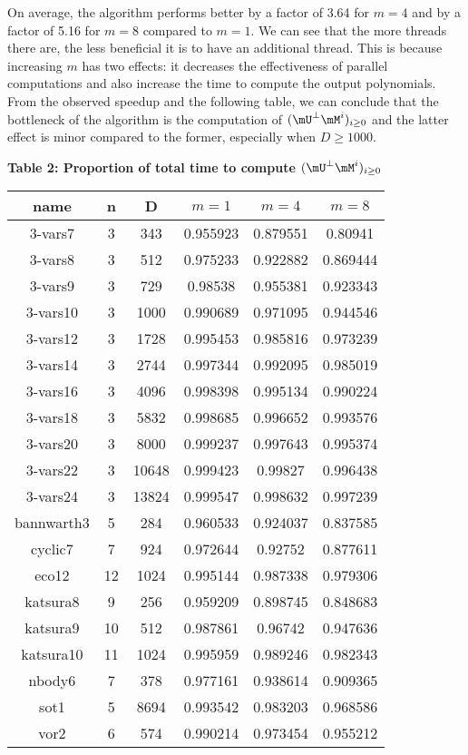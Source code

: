 \documentclass[12pt]{article}
\begin{document}
On average, the algorithm performs better by a factor of 3.64 for
$m=4$ and by a factor of 5.16 for $m=8$ compared to $m=1$. We can
see that the more threads there are, the less beneficial it is
to have an additional thread. This is because
increasing $m$ has two effects: it
decreases the effectiveness of parallel computations and
also increase the time to compute the output polynomials.
From the observed speedup and the following table, 
we can conclude that the bottleneck of the
algorithm is the computation of $(\mU^{\perp} \mM^i)_{i\ge0}$ and
the latter effect is minor compared to the former, especially when
$D \ge 1000$.
\begin{center}
	\textbf{Table 2: Proportion of total time to compute $(\mU^{\perp} \mM^i)_{i\ge0}$}
	\begin{tabular}{c|c|c|c|c|c}
		\textbf{name} & n & D & $m=1$ & $m=4$ & $m=8$\\
		\hline
		3-vars7&3 &343&0.955923&0.879551&0.80941\\
		3-vars8&3 &512&0.975233&0.922882&0.869444\\
		3-vars9&3 &729&0.98538&0.955381&0.923343\\
		3-vars10&3 &1000&0.990689&0.971095&0.944546\\
		3-vars12&3 &1728&0.995453&0.985816&0.973239\\
		3-vars14&3 &2744&0.997344&0.992095&0.985019\\
		3-vars16&3 &4096&0.998398&0.995134&0.990224\\
		3-vars18&3 &5832&0.998685&0.996652&0.993576\\
		3-vars20&3 &8000&0.999237&0.997643&0.995374\\
		3-vars22&3 &10648&0.999423&0.99827&0.996438\\
		3-vars24&3 &13824&0.999547&0.998632&0.997239\\
		bannwarth3&5 &284&0.960533&0.924037&0.837585\\
		cyclic7&7 &924&0.972644&0.92752&0.877611\\
		eco12&12 &1024&0.995144&0.987338&0.979306\\
		katsura8&9 &256&0.959209&0.898745&0.848683\\
		katsura9&10 &512&0.987861&0.96742&0.947636\\
		katsura10&11 &1024&0.995959&0.989246&0.982343\\
		nbody6&7 &378&0.977161&0.938614&0.909365\\
		sot1&5 &8694&0.993542&0.983203&0.968586\\
		vor2&6 &574&0.990214&0.973454&0.955212\\	
	\end{tabular}
\end{center}
\end{document}

